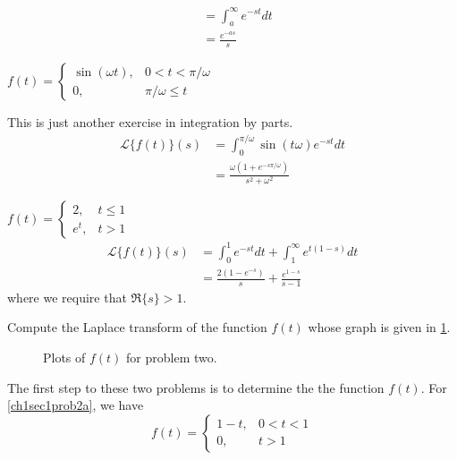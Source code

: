 \begin{exercise}
\begin{exercise}[label = (\alph*), ref = \arabic{exercisei} (\alph*)]
\begin{align*}
                             & = \int_a^{\infty}e^{-st}dt\\
                             & = \frac{e^{-as}}{s}
    \end{align*}
  \item
    \(f(t) =
    \begin{cases}
      \sin(\omega t), & 0 < t < \pi/\omega\\
      0, & \pi/\omega\leq t
    \end{cases}\)
    \par\smallskip
    This is just another exercise in integration by parts.
    \begin{align*}
      \mathcal{L}\{f(t)\}(s) & = \int_0^{\pi/\omega}\sin(t\omega)e^{-st}dt\\
                             & = \frac{\omega(1 + e^{-s\pi/\omega})}
                               {s^2 + \omega^2}
    \end{align*}
  \item
    \(f(t) =
    \begin{cases}
      2, & t\leq 1\\
      e^t, & t > 1
    \end{cases}\)
    \begin{align*}
      \mathcal{L}\{f(t)\}(s) & = \int_0^1e^{-st}dt +
                               \int_1^{\infty}e^{t(1 - s)}dt\\
                             & = \frac{2(1 - e^{-s})}{s} +
                               \frac{e^{1 - s}}{s - 1}
    \end{align*}
    where we require that \(\Re\{s\} > 1\).
  \end{exercise}
\item
  Compute the Laplace transform of the function \(f(t)\) whose graph is given
  in \cref{ch1sec1}.
  \begin{figure}[H]
    \centering
    \subcaptionbox{\label{ch1sec1prob2a}}{
      }
    \qquad
    \subcaptionbox{\label{ch1sec1prob2b}}{
      }
    \caption{Plots of \(f(t)\) for problem two.}
    \label{ch1sec1}
  \end{figure}
  The first step to these two problems is to determine the the function
  \(f(t)\).
  For \cref{ch1sec1prob2a}, we have
  \[
  f(t) =
  \begin{cases}
    1 - t, & 0 < t < 1\\
    0, & t > 1
  \end{cases}
\]
\end{exercise}
